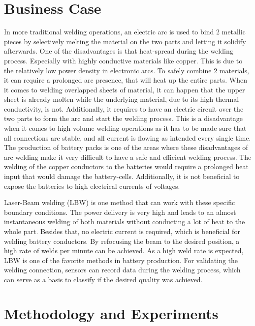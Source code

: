 \documentclass[12pt]{report}
\begin{document}
\chapter{Business Case}
In more traditional welding operations, an electric arc is used to bind 2 metallic pieces by selectively melting the material on the two parts and letting it solidify afterwards. One of the disadvantages is that heat-spread during the welding process. Especially with highly conductive materials like copper. This is due to the relatively low power density in electronic arcs. To safely combine 2 materials, it can require a prolonged arc presence, that will heat up the entire parts. When it comes to welding overlapped sheets of material, it can happen that the upper sheet is already molten while the underlying material, due to its high thermal conductivity, is not. Additionally, it requires to have an electric circuit over the two parts to form the arc and start the welding process. This is a disadvantage when it comes to high volume welding operations as it has to be made sure that all connections are stable, and all current is flowing as intended every single time.
The production of battery packs is one of the areas where these disadvantages of arc welding make it very difficult to have a safe and efficient welding process. The welding of the copper conductors to the batteries would require a prolonged heat input that would damage the battery-cells. Additionally, it is not beneficial to expose the batteries to high electrical currents of voltages.


Laser-Beam welding (LBW) is one method that can work with these specific boundary conditions.
The power delivery is very high and leads to an almost instantaneous welding of both materials without conducting a lot of heat to the whole part. Besides that, no electric current is required, which is beneficial for welding battery conductors. By refocusing the beam to the desired position, a high rate of welds per minute can be achieved. As a high weld rate is expected, LBW is one of the favorite methods in battery production.
For validating the welding connection, sensors can record data during the welding process, which can serve as a basis to classify if the desired quality was achieved. %

\chapter{Methodology and Experiments}
\end{document}
